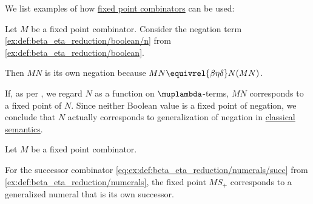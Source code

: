 \begin{example}\label{ex:def:function_fixed_point_combinator}
  We list examples of how \hyperref[def:function_fixed_point_combinator]{fixed point combinators} can be used:
  \begin{thmenum}
     Let \( M \) be a fixed point combinator. Consider the negation term \ref{ex:def:beta_eta_reduction/boolean/n} from \cref{ex:def:beta_eta_reduction/boolean}.

    Then \( MN \) is its own negation because \( MN \equivrel{\beta\eta\delta} N(MN) \).

    If, as per , we regard \( N \) as a function on \( \muplambda \)-terms, \( MN \) corresponds to a fixed point of \( N \). Since neither Boolean value is a fixed point of negation, we conclude that \( N \) actually corresponds to generalization of negation in \hyperref[def:truth_value_algebra/classical]{classical semantics}.

     Let \( M \) be a fixed point combinator.

    For the successor combinator \ref{eq:ex:def:beta_eta_reduction/numerals/succ} from \cref{ex:def:beta_eta_reduction/numerals}, the fixed point \( MS_+ \) corresponds to a generalized numeral that is its own successor.
  \end{thmenum}
\end{example}

